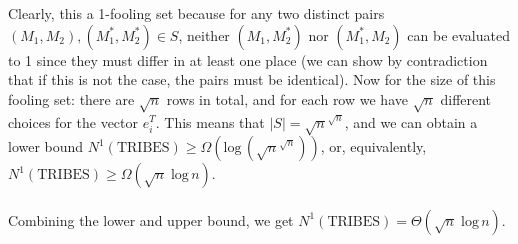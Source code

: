 \documentclass{article}
\begin{document}
\begin{enumerate}
\begin{enumerate}[label=(\alph*)]
                Clearly, this a 1-fooling set because for any two distinct
                pairs $(M_1, M_2), (M_1^*, M_2^*) \in S$, neither $(M_1,
                M_2^*)$ nor $(M_1^*, M_2)$ can be evaluated to 1 since they
                must differ in at least one place (we can show by contradiction
                that if this is not the case, the pairs must be identical). Now
                for the size of this fooling set: there are $\sqrt{n}$ rows in
                total, and for each row we have $\sqrt{n}$ different choices
                for the vector $e_i^T$. This means that $|S| =
                \sqrt{n}^{\sqrt{n}}$, and we can obtain a lower bound
                $N^1(\textrm{TRIBES}) \geq \Omega(\textrm{log}\, \left(
                \sqrt{n}^{\sqrt{n}} \right) )$, or, equivalently,
                $N^1(\textrm{TRIBES}) \geq \Omega(\sqrt{n}\;\textrm{log}\,n)$.
                \\\\
                Combining the lower and upper bound, we get
                $N^1(\textrm{TRIBES}) = \Theta(\sqrt{n}\;\textrm{log}\,n)$.
                \\


\end{enumerate}
\end{enumerate}
\end{document}
